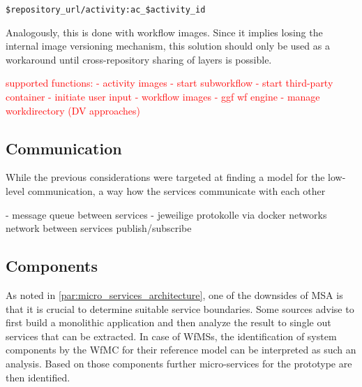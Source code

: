   \centerline{\texttt{\$repository\_url/activity:ac\_\$activity\_id}}

  Analogously, this is done with workflow images. Since it implies losing the internal image versioning mechanism, this solution should only be used as a workaround until cross-repository sharing of layers is possible.


\textcolor{red}{
  supported functions:
    - activity images
      - start subworkflow
      - start third-party container
      - initiate user input
    - workflow images
      - ggf wf engine
      - manage workdirectory (DV approaches)
}

\subsection{Communication} %
  \label{sub:application_level_communication}
  While the previous considerations were targeted at finding a model for the low-level communication, a way how the services communicate with each other

  - message queue between services
  - jeweilige protokolle via docker networks network between
  services publish/subscribe






\subsection{Components} %
  \label{sub:components}
  As noted in \ref{par:micro_services_architecture}, one of the downsides of \ac{MSA} is that it is crucial to determine suitable service boundaries. Some sources advise to first build a monolithic application and then analyze the result to single out services that can be extracted. In case of \acp{WfMS}, the identification of system components by the \ac{WfMC} for their reference model can be interpreted as such an analysis. Based on those components further micro-services for the prototype are then identified.

